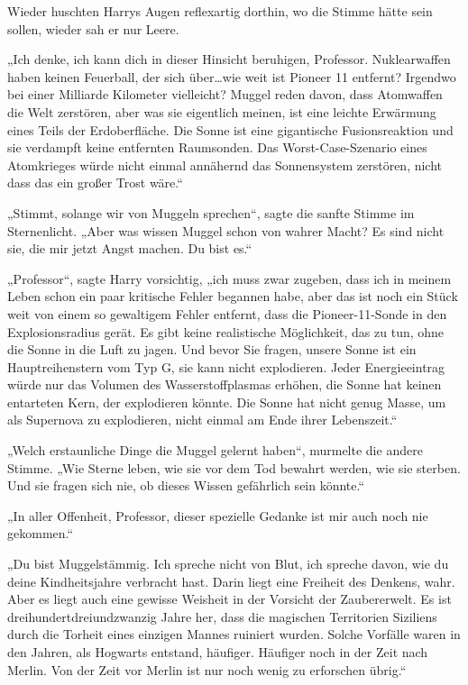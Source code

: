 {Wieder huschten Harrys Augen reflexartig dorthin, wo die Stimme hätte sein sollen, wieder sah er nur Leere.

„Ich denke, ich kann dich in dieser Hinsicht beruhigen, Professor. Nuklearwaffen haben keinen Feuerball, der sich über…wie weit ist Pioneer 11 entfernt? Irgendwo bei einer Milliarde Kilometer vielleicht? Muggel reden davon, dass Atomwaffen die Welt zerstören, aber was sie eigentlich meinen, ist eine leichte Erwärmung eines Teils der Erdoberfläche. Die Sonne ist eine gigantische Fusionsreaktion und sie verdampft keine entfernten Raumsonden. Das Worst-Case-Szenario eines Atomkrieges würde nicht einmal annähernd das Sonnensystem zerstören, nicht dass das ein großer Trost wäre.“

„Stimmt, solange wir von Muggeln sprechen“, sagte die sanfte Stimme im Sternenlicht. „Aber was wissen Muggel schon von wahrer Macht? Es sind nicht sie, die mir jetzt Angst machen. Du bist es.“

„Professor“, sagte Harry vorsichtig, „ich muss zwar zugeben, dass ich in meinem Leben schon ein paar kritische Fehler begannen habe, aber das ist noch ein Stück weit von einem so gewaltigem Fehler entfernt, dass die Pioneer-11-Sonde in den Explosionsradius gerät. Es gibt keine realistische Möglichkeit, das zu tun, ohne die Sonne in die Luft zu jagen. Und bevor Sie fragen, unsere Sonne ist ein Hauptreihenstern vom Typ G, sie kann nicht explodieren. Jeder Energieeintrag würde nur das Volumen des Wasserstoffplasmas erhöhen, die Sonne hat keinen entarteten Kern, der explodieren könnte. Die Sonne hat nicht genug Masse, um als Supernova zu explodieren, nicht einmal am Ende ihrer Lebenszeit.“

„Welch erstaunliche Dinge die Muggel gelernt haben“, murmelte die andere Stimme. „Wie Sterne leben, wie sie vor dem Tod bewahrt werden, wie sie sterben. Und sie fragen sich nie, ob dieses Wissen gefährlich sein könnte.“

„In aller Offenheit, Professor, dieser spezielle Gedanke ist mir auch noch nie gekommen.“

„Du bist Muggelstämmig. Ich spreche nicht von Blut, ich spreche davon, wie du deine Kindheitsjahre verbracht hast. Darin liegt eine Freiheit des Denkens, wahr. Aber es liegt auch eine gewisse Weisheit in der Vorsicht der Zaubererwelt. Es ist dreihundertdreiundzwanzig Jahre her, dass die magischen Territorien Siziliens durch die Torheit eines einzigen Mannes ruiniert wurden. Solche Vorfälle waren in den Jahren, als Hogwarts entstand, häufiger. Häufiger noch in der Zeit nach Merlin. Von der Zeit vor Merlin ist nur noch wenig zu erforschen übrig.“

}
